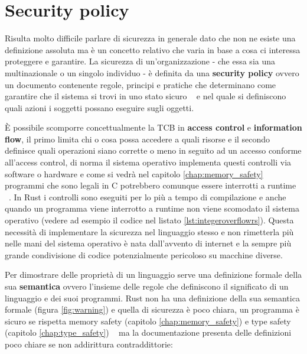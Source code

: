 \documentclass[Lau,binding=0.6cm]{sapthesis}
\begin{document}
\chapter{Security policy} \label{chap:security_policy}

Risulta molto difficile parlare di sicurezza in generale dato che non ne esiste una definizione assoluta ma è un concetto relativo che varia in base a cosa ci interessa proteggere e garantire. 
La sicurezza di un'organizzazione - che essa sia una multinazionale o un singolo individuo - è definita da una \textbf{security policy} ovvero un documento contenente regole, principi e pratiche che determinano come garantire che il sistema si trovi in uno stato sicuro ~\cite{milner:type_polymorphism} e nel quale si definiscono quali azioni i soggetti possano eseguire sugli oggetti. 

È possibile scomporre concettualmente la TCB in \textbf{access control} e \textbf{information flow}, il primo limita chi o cosa possa accedere a quali risorse e il secondo definisce quali operazioni siano corrette o meno in seguito ad un accesso conforme all'access control, di norma il sistema operativo implementa questi controlli via software o hardware e come si vedrà nel capitolo \ref{chap:memory_safety} programmi che sono legali in C potrebbero comunque essere interrotti a runtime ~\cite{nino:security_programming_language}.
In Rust i controlli sono eseguiti per lo più a tempo di compilazione e anche quando un programma viene interrotto a runtime non viene scomodato il sistema operativo (vedere ad esempio il codice nel listato \ref{lst:integeroverflowrs}). 
Questa necessità di implementare la sicurezza nel linguaggio stesso e non rimetterla più nelle mani del sistema operativo è nata dall'avvento di internet e la sempre più grande condivisione di codice potenzialmente pericoloso su macchine diverse.

Per dimostrare delle proprietà di un linguaggio serve una definizione formale della sua \textbf{semantica} ovvero l'insieme delle regole che definiscono il significato di un linguaggio e dei suoi programmi.
Rust non ha una definizione della sua semantica formale (figura \ref{fig:warning}) e quella di sicurezza è poco chiara, un programma è sicuro se rispetta memory safety (capitolo \ref{chap:memory_safety}) e type safety (capitolo \ref{chap:type_safety}) ~\cite[14]{rust:reference} ma la documentazione presenta delle definizioni poco chiare se non addirittura contraddittorie: 

\vspace{5mm}
\end{document}
